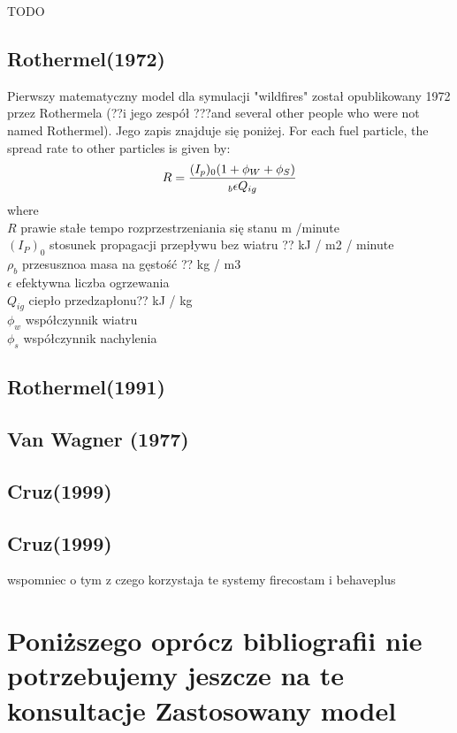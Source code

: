 \documentclass[a4paper, 11pt]{article}
\begin{document}
	
	\indent
	TODO\\
	\subsection{Rothermel(1972)}
	Pierwszy matematyczny model dla symulacji "wildfires" został opublikowany 1972 przez Rothermela (??i jego zespół ???and several other people who were not named Rothermel). Jego zapis znajduje się poniżej.
	For each fuel particle, the spread rate to other particles is given by: 
$$
R=\frac{(I_p)_0(1+\phi_W +\phi_S)}{_b\epsilon Q_{ig}}\\
$$
where\\
$R$	prawie stałe tempo rozprzestrzeniania się stanu	m /minute\\
$(I_P)_0$	stosunek propagacji przepływu bez wiatru ??	kJ / m2 / minute\\
$\rho_b$	przesusznoa masa na gęstość ??	kg / m3\\
$\epsilon$ efektywna liczba ogrzewania	\\
$Q_{ig}$	ciepło przedzapłonu??	kJ / kg\\
$\phi_w$	współczynnik wiatru	\\
$\phi_s$	współczynnik nachylenia\\

\subsection{Rothermel(1991)}
\subsection{Van Wagner (1977)}
\subsection{Cruz(1999)}
\subsection{Cruz(1999)}
	

	wspomniec o tym z czego korzystaja te systemy firecostam i behaveplus
	
	
	
	\section{Poniższego oprócz bibliografii nie potrzebujemy jeszcze na te konsultacje  Zastosowany model}
	\indent
\end{document}
